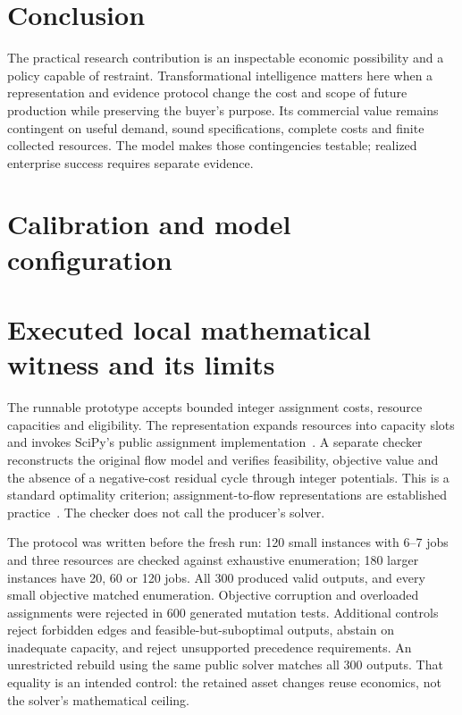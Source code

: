 \documentclass[11pt,letterpaper]{article}
\begin{document}
\section{Conclusion}

The practical research contribution is an inspectable economic possibility and a policy capable of restraint. Transformational intelligence matters here when a representation and evidence protocol change the cost and scope of future production while preserving the buyer's purpose. Its commercial value remains contingent on useful demand, sound specifications, complete costs and finite collected resources. The model makes those contingencies testable; realized enterprise success requires separate evidence.

\appendix
\section{Calibration and model configuration}


\section{Executed local mathematical witness and its limits}
The runnable prototype accepts bounded integer assignment costs, resource capacities and eligibility. The representation expands resources into capacity slots and invokes SciPy's public assignment implementation~\cite{SciPy}. A separate checker reconstructs the original flow model and verifies feasibility, objective value and the absence of a negative-cost residual cycle through integer potentials. This is a standard optimality criterion; assignment-to-flow representations are established practice~\cite{Flow}. The checker does not call the producer's solver.

The protocol was written before the fresh run: 120 small instances with 6--7 jobs and three resources are checked against exhaustive enumeration; 180 larger instances have 20, 60 or 120 jobs. All 300 produced valid outputs, and every small objective matched enumeration. Objective corruption and overloaded assignments were rejected in 600 generated mutation tests. Additional controls reject forbidden edges and feasible-but-suboptimal outputs, abstain on inadequate capacity, and reject unsupported precedence requirements. An unrestricted rebuild using the same public solver matches all 300 outputs. That equality is an intended control: the retained asset changes reuse economics, not the solver's mathematical ceiling.
\end{document}
